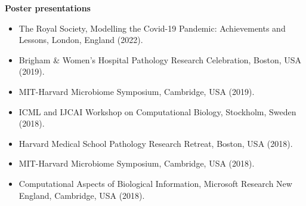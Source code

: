 \documentclass[11pt]{article}
\begin{document}
\vspace*{.4cm}
\noindent\textbf{Poster presentations}
\vspace*{.5cm}
\begin{itemize}[leftmargin=*]
\setlength{\itemsep}{4pt}
\setlength{\parskip}{0pt}
\setlength{\parsep}{0pt}
\vspace{-.5cm}
\item The Royal Society, Modelling the Covid-19 Pandemic: Achievements and Lessons, London, England (2022).
\item Brigham \& Women's Hospital Pathology Research Celebration, Boston, USA (2019).
\item MIT-Harvard Microbiome Symposium, Cambridge, USA (2019).
\item ICML and IJCAI Workshop on Computational Biology, Stockholm, Sweden (2018).
\item Harvard Medical School Pathology Research Retreat, Boston, USA (2018).
\item MIT-Harvard Microbiome Symposium, Cambridge, USA (2018).
\item Computational Aspects of Biological Information, Microsoft Research New England, Cambridge, USA (2018).
\end{itemize}
\end{document}
